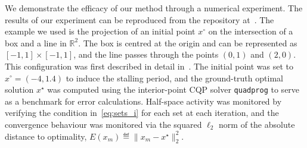 \documentclass[onecolumn]{autart}
\begin{document}
We demonstrate the efficacy of our method through a numerical experiment. The results of our experiment can be reproduced from the repository at~\cite{DykstraProjectRepo}. The example we used is the projection of an initial point $x^\circ$ on the intersection of a box and a line in $\mathbb{R}^2$. The box is centred at the origin and can be represented as $[-1, 1] \times [-1, 1]$, and the line passes through the points $(0,1)$ and $(2, 0)$. This configuration was first described in detail in~\cite{DYKSTRASTALLING}. The initial point was set to $x^\circ = (-4, 1.4)$ to induce the stalling period, and the ground-truth optimal solution $x^\star$ was computed using the interior-point CQP solver \texttt{quadprog} to serve as a benchmark for error calculations. Half-space activity was monitored by verifying the condition in~\eqref{eq:sets_i} for each set at each iteration, and the convergence behaviour was monitored via the squared $\ell_2$ norm of the absolute distance to optimality, $E(x_m) \eqdef \| x_m - x^\star \|_2^2$.

\end{document}
